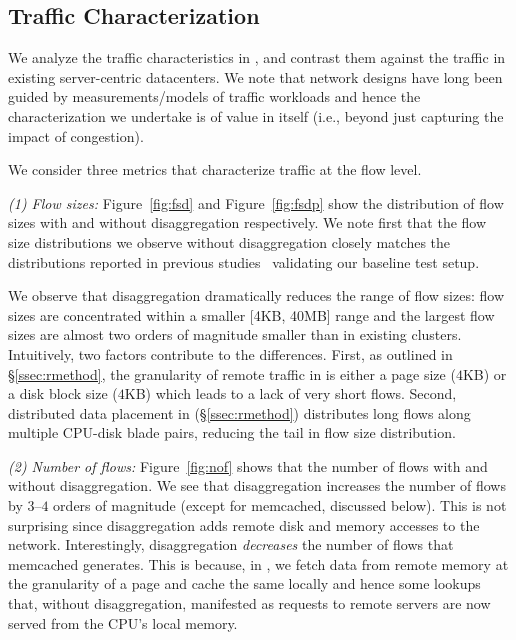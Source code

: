 \subsection{Traffic Characterization} 
\label{ssec:flc}
We analyze the traffic characteristics in \dis, and contrast them against the traffic in existing server-centric datacenters. 
We note that network designs have long been guided by measurements/models of traffic workloads and hence the characterization we undertake is of value in itself (i.e., beyond  just capturing the impact of congestion).

 We consider three metrics that characterize traffic at the flow level.

\noindent \emph{(1) Flow sizes:} Figure~\ref{fig:fsd} and Figure~\ref{fig:fsdp} show the distribution of flow sizes with and without disaggregation respectively. We note first that the flow size distributions we observe without disaggregation closely matches the distributions reported in previous studies~\cite{srikanth, theo} validating our baseline test setup. 

We observe that disaggregation dramatically reduces the range of flow sizes: flow sizes are concentrated within a smaller [4KB, 40MB] range and the largest flow sizes are almost two orders of magnitude smaller than in existing clusters.  Intuitively, two factors contribute to the differences. First, as outlined in \S\ref{ssec:rmethod}, the granularity of remote traffic in \dis is either a page size ($4$KB) or a disk block size ($4$KB) which leads to a lack of very short flows. Second, distributed data placement in \dis (\S\ref{ssec:rmethod}) distributes long flows along multiple CPU-disk blade pairs, reducing the tail in flow size distribution.

\noindent \emph{(2) Number of flows:} 
Figure~\ref{fig:nof} shows that the number of flows with and without disaggregation. We see that disaggregation increases the number of flows by $3$--$4$ orders of magnitude (except for memcached, discussed below). This is not surprising since disaggregation adds remote disk and memory accesses to the network. Interestingly, disaggregation \emph{decreases} the number of flows that memcached generates.
This is because, in \dis, we fetch data from remote memory at the granularity of a page and cache the same locally and hence some lookups that, without disaggregation, manifested as requests to 
remote servers are now served from the CPU's local memory.

